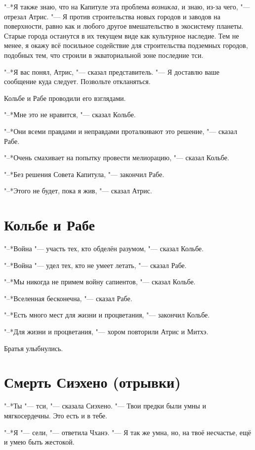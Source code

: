 "--*Я также знаю, что на Капитуле эта проблема \emph{возникла}, и знаю, из-за чего, "--- отрезал Атрис.
"--- Я против строительства новых городов и заводов на поверхности, равно как и любого другое вмешательство в экосистему планеты.
Старые города останутся в их текущем виде как культурное наследие.
Тем не менее, я окажу всё посильное содействие для строительства подземных городов, подобных тем, что строили в экваториальной зоне последние тси.

"--*Я вас понял, Атрис, "--- сказал представитель.
"--- Я доставлю ваше сообщение куда следует.
Позвольте откланяться.

Кольбе и Рабе проводили его взглядами.

"--*Мне это не нравится, "--- сказал Кольбе.

"--*Они всеми правдами и неправдами проталкивают это решение, "--- сказал Рабе.

"--*Очень смахивает на попытку провести мелиорацию, "--- сказал Кольбе.

"--*Без решения Совета Капитула, "--- закончил Рабе.

"--*Этого не будет, пока я жив, "--- сказал Атрис.

\section{Кольбе и Рабе}

"--*Война "--- участь тех, кто обделён разумом, "--- сказал Кольбе.

"--*Война "--- удел тех, кто не умеет летать, "--- сказал Рабе.

"--*Мы никогда не примем войну сапиентов, "--- сказал Кольбе.

"--*Вселенная бесконечна, "--- сказал Рабе.

"--*Есть много мест для жизни и процветания, "--- закончил Кольбе.

"--*Для жизни и процветания, "--- хором повторили Атрис и Митхэ.

Братья улыбнулись.

\section{Смерть Сиэхено (отрывки)}

"--*Ты "--- тси, "--- сказала Сиэхено.
"--- Твои предки были умны и мягкосердечны.
Это есть и в тебе.

"--*Я "--- сели, "--- ответила Чханэ.
"--- Я так же умна, но, на твоё несчастье, ещё и умею быть жестокой.

